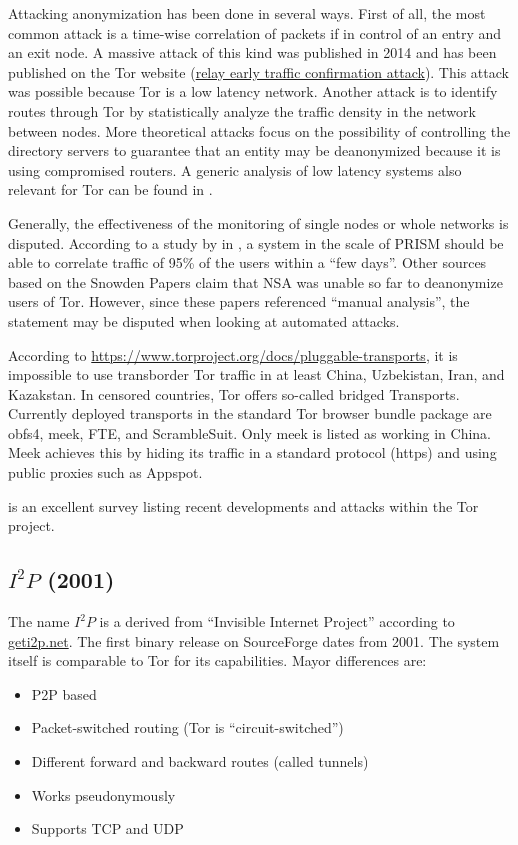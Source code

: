 Attacking anonymization has been done in several ways. First of all, the most common attack is a time-wise correlation of packets if in control of an entry and an exit node. A massive attack of this kind was published in 2014 and has been published on the Tor website (\href{https://blog.torproject.org/blog/tor-security-advisory-relay-early-traffic-confirmation-attack}{relay early traffic confirmation attack}). This attack was possible because Tor is a low latency network. Another attack is to identify routes through Tor by statistically analyze the traffic density in the network between nodes. More theoretical attacks focus on the possibility of controlling the directory servers to guarantee that an entity may be deanonymized because it is using compromised routers. A generic analysis of low latency systems also relevant for Tor can be found in \cite{johnson2009design}.

Generally, the effectiveness of the monitoring of single nodes or whole networks is disputed. According to a study by \citeauthor{ccs2013-usersrouted} in \citeyear{ccs2013-usersrouted}\cite{ccs2013-usersrouted}, a system in the scale of PRISM should be able to correlate traffic of 95\% of the users within a ``few days''. Other sources based on the Snowden Papers claim that NSA was unable so far to deanonymize users of  Tor. However, since these papers referenced ``manual analysis'', the statement may be disputed when looking at automated attacks.

According to \url{https://www.torproject.org/docs/pluggable-transports}, it is impossible to use transborder Tor traffic in at least China, Uzbekistan, Iran, and Kazakstan. In censored countries, Tor offers so-called bridged Transports. Currently deployed transports in the standard Tor browser bundle package are obfs4, meek, FTE, and ScrambleSuit. Only meek is listed as working in China. Meek achieves this by hiding its traffic in a standard protocol (https) and using public proxies such as Appspot.

\cite{saleh2018shedding} is an excellent survey listing recent developments and attacks within the Tor project.

\subsection{\texorpdfstring{$I^2P$}{I2P} (2001)}
The name $I^2P$ is a derived from  ``Invisible Internet Project'' according to \href{https://geti2p.net/}{geti2p.net}. The first binary release on SourceForge dates from 2001. The system itself is comparable to Tor for its capabilities. Mayor differences are:
\begin{itemize}
	\item P2P based
	\item Packet-switched routing (Tor is ``circuit-switched'')
	\item Different forward and backward routes (called tunnels)
	\item Works pseudonymously
	\item Supports TCP and UDP
\end{itemize}

